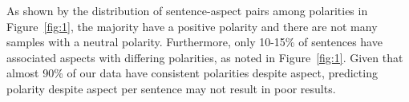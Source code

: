 \documentclass[comsoc,conference]{IEEEtran}
\begin{document}
As shown by the distribution of sentence-aspect pairs among polarities in Figure~\ref{fig:1}, the majority have a positive polarity and there are not many samples with a neutral polarity. Furthermore, only 10-15\% of sentences have associated aspects with differing polarities, as noted in Figure~\ref{fig:1}. Given that almost 90\% of our data have consistent polarities despite aspect, predicting polarity despite aspect per sentence may not result in poor results. 

\begin{figure}[!htbp]
    \centering
    \hfill
    \\

\end{figure}
\end{document}
